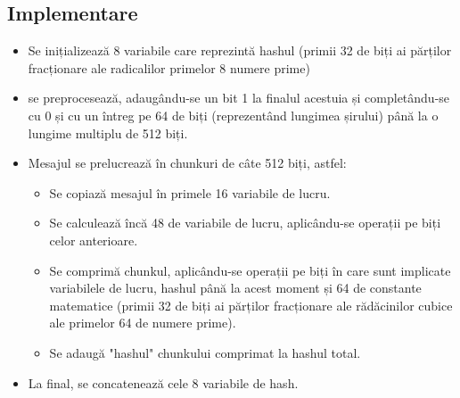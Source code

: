 \documentclass{article}
\begin{document}
\subsection{Implementare}
\begin{itemize}
      \item  Se inițializează 8 variabile care reprezintă hashul (primii 32 de
            biți ai părților fracționare ale radicalilor primelor 8 numere prime)

      \item se preprocesează, adaugându-se un bit 1 la finalul acestuia și
            completându-se cu 0 și cu un întreg pe 64 de biți (reprezentând
            lungimea șirului) până la o lungime multiplu de 512 biți.

      \item Mesajul se prelucrează în chunkuri de câte 512 biți, astfel:
            \begin{itemize}
                  \item Se copiază mesajul în primele 16 variabile de lucru.
                  \item Se calculează încă 48 de variabile de lucru, aplicându-se
                        operații pe biți celor anterioare.
                  \item Se comprimă chunkul, aplicându-se operații pe biți în care
                        sunt implicate variabilele de lucru, hashul până la acest
                        moment și 64 de constante matematice (primii 32 de biți ai
                        părților fracționare ale rădăcinilor cubice ale primelor 64
                        de numere prime).
                  \item Se adaugă "hashul" chunkului comprimat la hashul total.
            \end{itemize}

      \item La final, se concatenează cele 8 variabile de hash.
\end{itemize}
\end{document}
